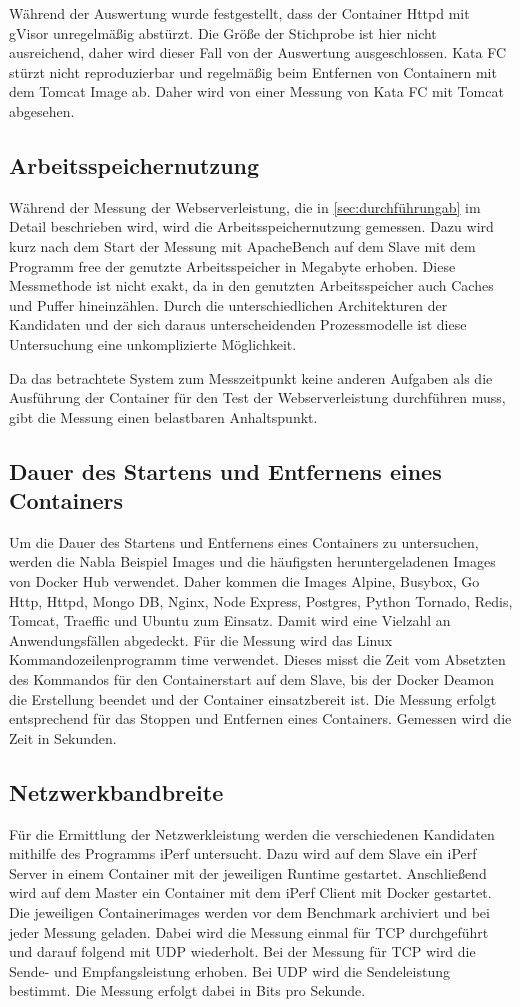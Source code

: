 Während der Auswertung wurde festgestellt, dass der Container Httpd mit gVisor unregelmäßig abstürzt. Die Größe der Stichprobe ist hier nicht ausreichend, daher wird dieser Fall von der Auswertung ausgeschlossen. Kata FC stürzt nicht reproduzierbar und regelmäßig beim Entfernen von Containern mit dem Tomcat Image ab. Daher wird von einer Messung von Kata FC mit Tomcat abgesehen.

\subsection{Arbeitsspeichernutzung}
Während der Messung der Webserverleistung, die in \ref{sec:durchführungab} im Detail beschrieben wird, wird die Arbeitsspeichernutzung gemessen. Dazu wird kurz nach dem Start der Messung mit ApacheBench auf dem Slave mit dem Programm free der genutzte Arbeitsspeicher in Megabyte erhoben.
Diese Messmethode ist nicht exakt, da in den genutzten Arbeitsspeicher auch Caches und Puffer hineinzählen. Durch die unterschiedlichen Architekturen der Kandidaten und der sich daraus unterscheidenden Prozessmodelle ist diese Untersuchung eine unkomplizierte Möglichkeit.

Da das betrachtete System zum Messzeitpunkt keine anderen Aufgaben als die Ausführung der Container für den Test der Webserverleistung durchführen muss, gibt die Messung einen belastbaren Anhaltspunkt.

\subsection{Dauer des Startens und Entfernens eines Containers}
Um die Dauer des Startens und Entfernens eines Containers zu untersuchen, werden die Nabla Beispiel Images und die häufigsten heruntergeladenen Images von Docker Hub verwendet. Daher kommen die Images Alpine, Busybox, Go Http, Httpd, Mongo DB, Nginx, Node Express, Postgres, Python Tornado, Redis, Tomcat, Traeffic und Ubuntu zum Einsatz. Damit wird eine Vielzahl an Anwendungsfällen abgedeckt. Für die Messung wird das Linux Kommandozeilenprogramm time verwendet. Dieses misst die Zeit vom Absetzten des Kommandos für den Containerstart auf dem Slave, bis der Docker Deamon die Erstellung beendet und der Container einsatzbereit ist. Die Messung erfolgt entsprechend für das Stoppen und Entfernen eines Containers. Gemessen wird die Zeit in Sekunden.

\subsection{Netzwerkbandbreite}
Für die Ermittlung der Netzwerkleistung werden die verschiedenen Kandidaten mithilfe des Programms iPerf untersucht. Dazu wird auf dem Slave ein iPerf Server in einem Container mit der jeweiligen Runtime gestartet. Anschließend wird auf dem Master ein Container mit dem iPerf Client mit Docker gestartet. Die jeweiligen Containerimages werden vor dem Benchmark archiviert und bei jeder Messung geladen. Dabei wird die Messung einmal für \ac{TCP} durchgeführt und darauf folgend mit \ac{UDP} wiederholt. Bei der Messung für \ac{TCP} wird die Sende- und Empfangsleistung erhoben. Bei \ac{UDP} wird die Sendeleistung bestimmt. Die Messung erfolgt dabei in Bits pro Sekunde.


